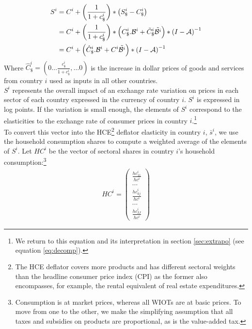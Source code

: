 \documentclass[11pt,a4paper]{paper} %
\begin{document}
\begin{equation}
\begin{aligned}
	S^i&=C^i  + \left( \frac{1}{1+{{c}_\$^i}}\right)*\left({S_\$^i}-{{C}_{\$}^i}\right)\\
	&=C^i + \left( \frac{1}{1+{{c}_\$^i}}\right)*\left(C_\$^i.{\cal B}^i+{\tilde{C}_\$^i}{\tilde{{\cal B}^i}}\right)*{{(I-{\cal A})}^{-1}} 	\\
	&=C^i	+ \left(\hat{C}^i_\$.{\cal B}^i+{C^i}{\tilde{{\cal B}^i}}\right)*{{(I-{\cal A})}^{-1}}	
\label{eq:eqdomcurrency}
\end{aligned}
\end{equation}
Where $\hat{C}^i_\$=\left(0 \ldots \frac{c_\$^i}{1+c_\$^i},\ldots 0 \right)$ is the increase in dollar prices of goods and services from country $i$ used as inputs in all other countries.\\ 
$S^i$ represents the overall impact of an exchange rate variation on prices in each sector of each country expressed in the currency of country $i$. $S^i$ is expressed in log points. If the variation is small enough, the elements of $S^i$ correspond to the elasticities to the exchange rate of consumer prices in country $i$.\footnote{We return to this equation and its interpretation in section \ref{sec:extrapo} (see equation \ref{eq:decomp}).}\\
To convert this vector into the HCE\footnote{The HCE deflator covers more products and has different sectoral weights than the headline consumer price index (CPI) as the former also encompasses, for example, the rental equivalent of real estate expenditures.}
 deflator elasticity in country $i$, $\bar{s}^i$, we use the household consumption shares to compute a weighted average of the elements of $S^i$. Let $HC^i$ be the vector of sectoral shares in country $i$'s household consumption:\footnote{Consumption is at market prices, whereas all WIOTs are at basic prices. To move from one to the other, we make the simplifying assumption that all taxes and subsidies on products are proportional, as is the value-added tax.}
\begin{eqnarray*}
HC^i=\left( 
	\begin{array}{c}
	\frac{{hc}_{11}^i}{hc^i} \\
	...\\
	\frac{{hc}_{kj}^i}{hc^i}\\
	...\\
	\frac{{hc}_{IJ}^i}{hc^i}
	 \end{array}
	 \right)
\end{eqnarray*}
\end{document}
